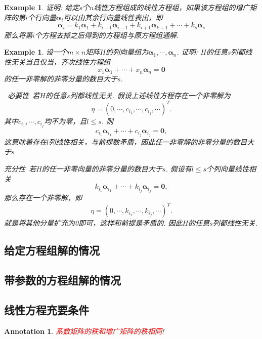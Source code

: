 \documentclass{article}
\newtheorem{example}[theorem]{Example}
\newtheorem{annotation}[theorem]{Annotation}
\newcommand{\hints}{{\color{blue} \text{hints}}}
\newcommand{\mbf}[1]{\bm{#1}}
\newcommand{\redt}[1]{\textcolor{red}{#1}}
\begin{document}
\begin{example}
\rm 证明: 给定$s$个$n$线性方程组成的线性方程组，如果该方程组的增广矩阵的第$i$个行向量$\mbf{\alpha}_i$可以由其余行向量线性表出，即
$$
\mbf{\alpha}_i = k_1\mbf{\alpha}_1 + k_{i-1}\mbf{\alpha}_{i-1} + k_{i+1}\mbf{\alpha}_{k+1} + \cdots + k_s\mbf{\alpha}_s 
$$
那么将第$i$个方程去掉之后得到的方程组与原方程组通解. 
\end{example}

\begin{example}
\rm 设一个$m \times n$矩阵$H$的列向量组为$\mbf{\alpha}_1,\cdots,\mbf{\alpha}_n$. 证明: $H$的任意$s$列都线性无关当且仅当，齐次线性方程组
$$
x_1 \mbf{\alpha}_1 + \cdots + x_n \mbf{\alpha}_n = \mbf{0}
$$
的任一非零解的非零分量的数目大于$s$. 

\hints\ \emph{必要性}\ 若$H$的任意$s$列都线性无关. 假设上述线性方程存在一个非零解为
$$
\eta = (0,\cdots,c_{i_1},\cdots,c_{i_j},\cdots)^{T}. 
$$
其中$c_{i_1},\cdots,c_{i_j}$均不为零，且$ l \leq s$. 则
$$
c_{i_1}\mbf{\alpha}_{i_1}+\cdots+c_{i_j}\mbf{\alpha}_{i_j} = \mbf{0},
$$
这意味着存在$l$列线性相关，与前提数矛盾，因此任一非零解的非零分量的数目大于$s$

\emph{充分性}\ 若$H$的任一非零向量的非零分量的数目大于$s$. 假设有$l\leq s$个列向量线性相关
$$
k_{i_1}\mbf{\alpha}_{i_1}+\cdots+k_{i_j}\mbf{\alpha}_{i_j} = \mbf{0},
$$
那么存在一个非零解，即
$$
\eta = (0,\cdots,k_{i_1},\cdots,k_{i_j},\cdots)^{T}. 
$$
就是将其他分量扩充为0即可，这样和前提是矛盾的. 因此$H$的任意$s$列都线性无关. 
\end{example}

\subsection{给定方程组解的情况}


\subsection{带参数的方程组解的情况}


\subsection{线性方程充要条件}

\begin{annotation}
\rm \redt{系数矩阵的秩和增广矩阵的秩相同}!
\end{annotation}
\end{document}
